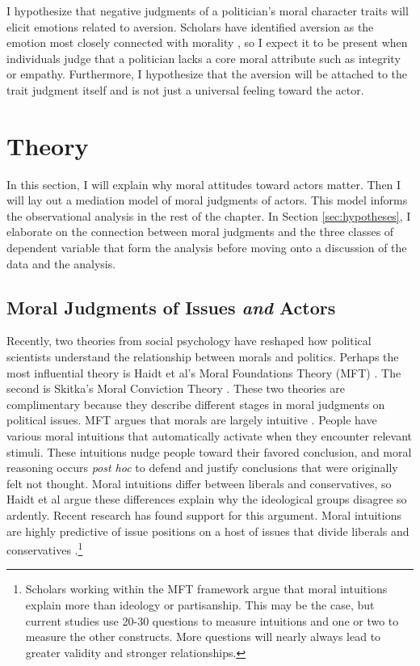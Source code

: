 I hypothesize that negative judgments of a politician's moral character traits will elicit emotions related to aversion. Scholars have identified aversion as the emotion most closely connected with morality \cite{Petersen2010,SteenbergenEllis2006}, so I expect it to be present when individuals judge that a politician lacks a core moral attribute such as integrity or empathy. Furthermore, I hypothesize that the aversion will be attached to the trait judgment itself and is not just a universal feeling toward the actor.




\section{Theory}
In this section, I will explain why moral attitudes toward actors matter. Then I will lay out a mediation model of moral judgments of actors. This model informs the observational analysis in the rest of the chapter. In Section \ref{sec:hypotheses}, I elaborate on the connection between moral judgments and the three classes of dependent variable that form the analysis before moving onto a discussion of the data and the analysis.

\subsection{Moral Judgments of Issues \emph{and} Actors}
Recently, two theories from social psychology have reshaped how political scientists understand the relationship between morals and politics. Perhaps the most influential theory is Haidt et al's Moral Foundations Theory (MFT) \cite{Grahametal2009,Haidt2012}. The second is Skitka's Moral Conviction Theory \cite{Skitka2010}. These two theories are complimentary because they describe different stages in moral judgments on political issues. MFT argues that morals are largely intuitive \cite{Haidt2001}. People have various moral intuitions that automatically activate when they encounter relevant stimuli. These intuitions nudge people toward their favored conclusion, and moral reasoning occurs \emph{post hoc} to defend and justify conclusions that were originally felt not thought. Moral intuitions differ between liberals and conservatives, so Haidt et al argue these differences explain why the ideological groups disagree so ardently. Recent research has found support for this argument. Moral intuitions are highly predictive of issue positions on a host of issues that divide liberals and conservatives \cite{Kolevaetal2012}.\footnote{Scholars working within the MFT framework argue that moral intuitions explain more than ideology or partisanship. This may be the case, but current studies use 20-30 questions to measure intuitions and one or two to measure the other constructs. More questions will nearly always lead to greater validity and stronger relationships.}

